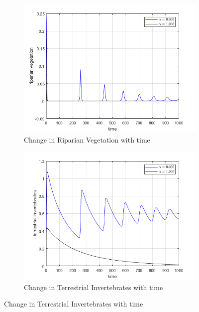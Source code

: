 \documentclass[12pt]{article}
\numberwithin{equation}{section}
\begin{document}
\FloatBarrier
\begin{figure}[bp!]
	\centering
        \caption{Variation in parameter $\alpha$}
	\begin{subfigure}[t]{0.45\textwidth}
		\centering
	\includegraphics[width=\textwidth]{time_vs_riparian_alpha.png}
		\caption{Change in Riparian Vegetation with time} \label{fig:time_vs_riparian_alpha}
	\end{subfigure}
\hspace{0.08\textwidth}
        \begin{subfigure}[t]{0.45\textwidth}
                 \centering
         \includegraphics[width=\textwidth]{time_vs_invertebrates_alpha.png}
		\caption{Change in Terrestrial Invertebrates with time} \label{fig:time_vs_invertebrates_alpha}

\end{subfigure}
\end{figure}
\end{document}
